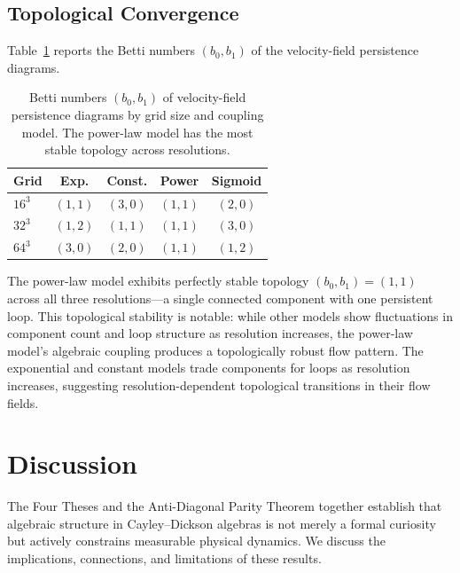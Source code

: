 \documentclass[12pt]{article}
\theoremstyle{definition}
\theoremstyle{plain}
\theoremstyle{remark}
\begin{document}
\subsection{Topological Convergence}

Table~\ref{tab:betti} reports the Betti numbers $(b_0, b_1)$ of the
velocity-field persistence diagrams.

\begin{table}[htbp]
\centering
\caption{Betti numbers $(b_0, b_1)$ of velocity-field persistence diagrams
by grid size and coupling model.  The power-law model has the most stable
topology across resolutions.}
\label{tab:betti}
\begin{tabular}{lcccc}
\toprule
\textbf{Grid} & \textbf{Exp.} & \textbf{Const.} &
  \textbf{Power} & \textbf{Sigmoid} \\
\midrule
$16^3$ & $(1, 1)$ & $(3, 0)$ & $(1, 1)$ & $(2, 0)$ \\
$32^3$ & $(1, 2)$ & $(1, 1)$ & $(1, 1)$ & $(3, 0)$ \\
$64^3$ & $(3, 0)$ & $(2, 0)$ & $(1, 1)$ & $(1, 2)$ \\
\bottomrule
\end{tabular}
\end{table}

The power-law model exhibits perfectly stable topology $(b_0, b_1) = (1, 1)$
across all three resolutions---a single connected component with one
persistent loop.  This topological stability is notable: while other models
show fluctuations in component count and loop structure as resolution
increases, the power-law model's algebraic coupling produces a
topologically robust flow pattern.  The exponential and constant models
trade components for loops as resolution increases, suggesting
resolution-dependent topological transitions in their flow fields.

\section{Discussion}
\label{sec:discussion}

The Four Theses and the Anti-Diagonal Parity Theorem together establish
that algebraic structure in Cayley--Dickson algebras is not merely a formal
curiosity but actively constrains measurable physical dynamics.  We discuss
the implications, connections, and limitations of these results.
\end{document}
